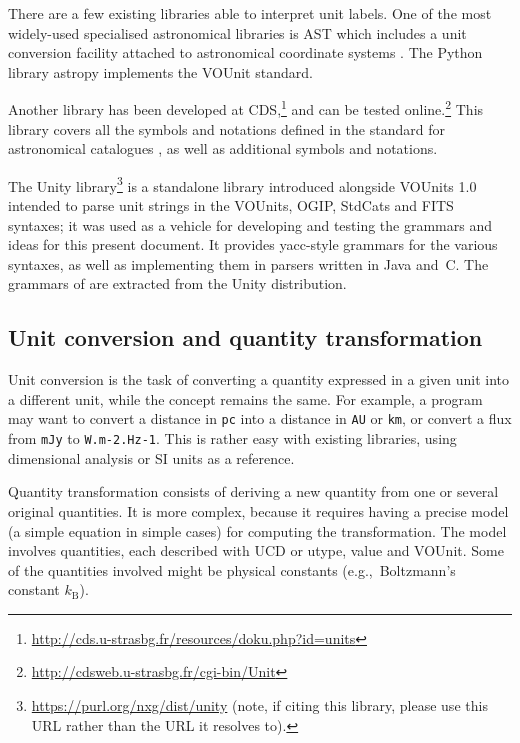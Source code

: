 \documentclass[11pt,a4paper]{ivoa}
\newcommand{\unit}[1]{\texttt{\small\color{orange}#1}}
\def\eg{e.g.,~}
\begin{document}
There are a few existing libraries able to interpret unit labels.
One of the most widely-used specialised
astronomical libraries is AST which includes a unit conversion
facility attached to astronomical coordinate systems \citep{berry12}.
The Python library astropy \citep{2013A+A...558A..33A} implements the
VOUnit standard.

Another library has been developed at
CDS,\footnote{\url{http://cds.u-strasbg.fr/resources/doku.php?id=units}}
and can be tested online.\footnote{\url{http://cdsweb.u-strasbg.fr/cgi-bin/Unit}} This library covers all
the symbols and notations defined in the standard for astronomical catalogues \citep[\S3.2]{cds00}, as well as
additional symbols and notations.

The Unity library\footnote{\url{https://purl.org/nxg/dist/unity}
(note, if citing this library, please use this URL rather than the URL
it resolves to).} is a
standalone library introduced alongside VOUnits 1.0
intended to parse unit strings in the VOUnits,
OGIP, StdCats and FITS syntaxes; it was used as a vehicle for
developing and testing the grammars and
ideas for this present document.  It provides yacc-style grammars for
the various syntaxes, as well as implementing them in parsers written
in Java and~C.  The grammars of  are extracted
from the Unity distribution.

\subsection{Unit conversion and quantity transformation\label{sec:conversion}}

Unit conversion is the task of converting a quantity expressed
in a given unit into a different unit, while the concept remains the
same. For example, a program may want to convert a distance
in \unit{pc} into a distance in \unit{AU} or \unit{km}, or convert a
flux from \unit{mJy} to \unit{W.m-2.Hz-1}. This is rather easy with
existing libraries, using dimensional analysis or SI units as a
reference.

Quantity transformation consists of deriving a new quantity from one or several original
quantities. It is more complex, because it requires having a precise model 
(a simple equation in simple cases) for computing the transformation. The model involves
quantities, each described with UCD or utype, value and VOUnit. Some of the quantities
involved might be physical constants (\eg  Boltzmann's constant $k_{\mathrm{B}}$).
\end{document}
